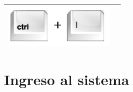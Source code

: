 \newpage
\begin{table}[H]
\begin{center}
\begin{tabular}{|p{6cm}|p{8cm}|}
\hline
\includegraphics[width=5.5cm]{./imagenes_documentacion/key_ctrl_i.png} & \vspace*{-.8in}{Sobre Graphvisualx. Se abre una nueva ventana donde viene información sobre el autor de Graphvisualx y demás.} \\
\hline
\end{tabular}
\end{center}
\end{table}

\section{Ingreso al sistema}


